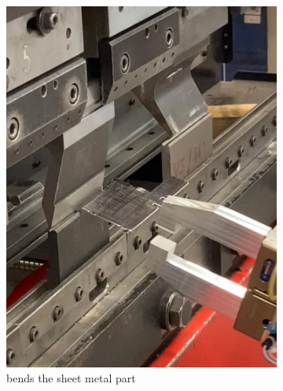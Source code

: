 \begin{figure}[h]
\begin{subfigure}[b]{0.32\textwidth}
        \includegraphics[width=\textwidth]{figures/bending/bending3-002.png}
        \caption{bends the sheet metal part}
        \label{subfig:bending3}
    \end{subfigure}\hspace{0.1cm}
    \begin{subfigure}[b]{0.32\textwidth}
        \centering

\end{subfigure}
\end{figure}
